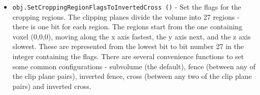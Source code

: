 \begin{itemize}
\item  \verb|obj.SetCroppingRegionFlagsToInvertedCross ()| -  Set the flags for the cropping regions. The clipping planes divide the
 volume into 27 regions - there is one bit for each region. The regions 
 start from the one containing voxel (0,0,0), moving along the x axis 
 fastest, the y axis next, and the z axis slowest. These are represented 
 from the lowest bit to bit number 27 in the integer containing the 
 flags. There are several convenience functions to set some common 
 configurations - subvolume (the default), fence (between any of the 
 clip plane pairs), inverted fence, cross (between any two of the 
 clip plane pairs) and inverted cross.

\end{itemize}
